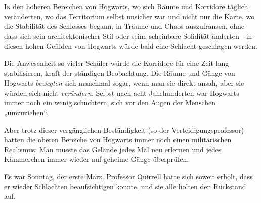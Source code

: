 
\lettrine{I}{n} den höheren Bereichen von Hogwarts, wo sich Räume und Korridore täglich veränderten, wo das Territorium selbst unsicher war und nicht nur die Karte, wo die Stabilität des Schlosses begann, in Träume und Chaos auszufransen, ohne dass sich sein architektonischer Stil oder seine scheinbare Solidität änderten—in diesen hohen Gefilden von Hogwarts würde bald eine Schlacht geschlagen werden.

Die Anwesenheit so vieler Schüler würde die Korridore für eine Zeit lang stabilisieren, kraft der ständigen Beobachtung. Die Räume und Gänge von Hogwarts \emph{bewegten} sich manchmal sogar, wenn man sie direkt ansah, aber sie würden sich nicht \emph{verändern}. Selbst nach acht Jahrhunderten war Hogwarts immer noch ein wenig schüchtern, sich vor den Augen der Menschen „umzuziehen“.

Aber trotz dieser vergänglichen Beständigkeit (so der Verteidigungsprofessor) hatten die oberen Bereiche von Hogwarts immer noch einen militärischen Realismus: Man musste das Gelände jedes Mal neu erlernen und jedes Kämmerchen immer wieder auf geheime Gänge überprüfen.

Es war Sonntag, der erste März. Professor Quirrell hatte sich soweit erholt, dass er wieder Schlachten beaufsichtigen konnte, und sie alle holten den Rückstand auf.

